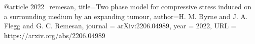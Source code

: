 @article{
      2022_remesan,
	title={Two phase model for compressive stress induced on a surrounding medium by an expanding tumour},
	author={H. M. Byrne and J. A. Flegg and G. C. Remesan},
      journal = {arXiv:2206.04989},
      year = 2022, 
      URL = {https://arxiv.org/abs/2206.04989}
}